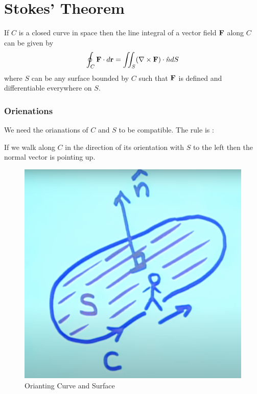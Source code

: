 

\chapter{Stokes' Theorem} 

\bigbreak

\begin{mdframed}
\begin{center}
If $C$ is a closed curve in space then the line integral of a vector field ${\bf F}$ along $C$ can be given by
$$ \oint_{C} {\bf F} \cdot d{\bf r} = \iint_S (\nabla \times {\bf F}) \cdot \hat{n} dS $$
where $S$ can be any surface bounded by $C$ such that ${\bf F}$ is defined and differentiable everywhere on $S$.
\end{center}
\end{mdframed} 

\subsection*{Orienations} 

We need the orianations of $C$ and $S$ to be compatible.
The rule is :

If we walk along $C$ in the direction of its orientation with $S$ to the left then the normal vector is pointing up.

\begin{figure}[ht!]
    \centering
    \includegraphics[scale=0.3]{./images/lecture_27_figure_1.png}
    \caption{Orianting Curve and Surface}
\end{figure}


